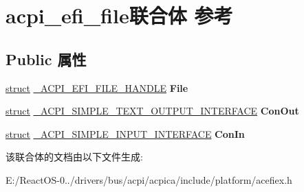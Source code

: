 \hypertarget{unionacpi__efi__file}{}\section{acpi\+\_\+efi\+\_\+file联合体 参考}
\label{unionacpi__efi__file}
\subsection*{Public 属性}
\begin{DoxyCompactItemize}
\item 
\mbox{\label{unionacpi__efi__file_a7af16d5fda0bb14b964d7099f101b9f4}} 
\hyperlink{interfacestruct}{struct} \hyperlink{struct___a_c_p_i___e_f_i___f_i_l_e___h_a_n_d_l_e}{\+\_\+\+A\+C\+P\+I\+\_\+\+E\+F\+I\+\_\+\+F\+I\+L\+E\+\_\+\+H\+A\+N\+D\+LE} {\bfseries File}
\item 
\mbox{\label{unionacpi__efi__file_a54db7fcb3057e92dd077c0a55deef99e}} 
\hyperlink{interfacestruct}{struct} \hyperlink{struct___a_c_p_i___s_i_m_p_l_e___t_e_x_t___o_u_t_p_u_t___i_n_t_e_r_f_a_c_e}{\+\_\+\+A\+C\+P\+I\+\_\+\+S\+I\+M\+P\+L\+E\+\_\+\+T\+E\+X\+T\+\_\+\+O\+U\+T\+P\+U\+T\+\_\+\+I\+N\+T\+E\+R\+F\+A\+CE} {\bfseries Con\+Out}
\item 
\mbox{\label{unionacpi__efi__file_a321ee7c6a859fd52db3303a33fd5743c}} 
\hyperlink{interfacestruct}{struct} \hyperlink{struct___a_c_p_i___s_i_m_p_l_e___i_n_p_u_t___i_n_t_e_r_f_a_c_e}{\+\_\+\+A\+C\+P\+I\+\_\+\+S\+I\+M\+P\+L\+E\+\_\+\+I\+N\+P\+U\+T\+\_\+\+I\+N\+T\+E\+R\+F\+A\+CE} {\bfseries Con\+In}
\end{DoxyCompactItemize}


该联合体的文档由以下文件生成\+:\begin{DoxyCompactItemize}
\item 
E\+:/\+React\+O\+S-\/0../drivers/bus/acpi/acpica/include/platform/acefiex.\+h\end{DoxyCompactItemize}
